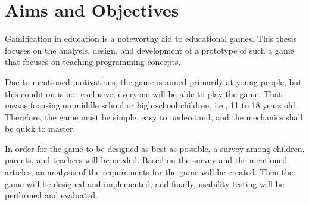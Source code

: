 \section{Aims and Objectives}

Gamification in education is a noteworthy aid to educational games.
This thesis focuses on the analysis, design, and development of a prototype of such a game
that focuses on teaching programming concepts.

Due to mentioned motivations, the game is aimed primarily at young people, but this condition is not exclusive; everyone will be able to play the game.
That means focusing on middle school or high school children, i.e., 11 to 18 years old.
Therefore, the game must be simple, easy to understand, and the mechanics shall be quick to master.

In order for the game to be designed as best as possible, a survey among children, parents, and teachers will be needed.
Based on the survey and the mentioned articles, an analysis of the requirements for the game will be created.
Then the game will be designed and implemented, and finally, usability testing will be performed and evaluated.
